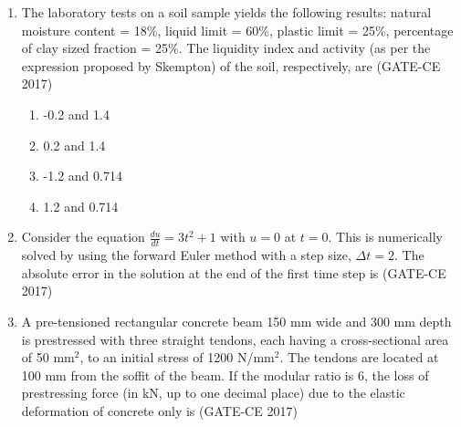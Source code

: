 \documentclass[journal,12pt,onecolumn]{article}
\theoremstyle{remark}
\begin{document}
\begin{enumerate}
    \item The laboratory tests on a soil sample yields the following results: natural moisture content = 18\%, liquid limit = 60\%, plastic limit = 25\%, percentage of clay sized fraction = 25\%. The liquidity index and activity (as per the expression proposed by Skempton) of the soil, respectively, are \hfill (GATE-CE 2017)
    \begin{multicols}{2}
    \begin{enumerate}
        \item -0.2 and 1.4
        \item 0.2 and 1.4
        \item -1.2 and 0.714
        \item 1.2 and 0.714
    \end{enumerate}
    \end{multicols}

    \item Consider the equation $\frac{du}{dt} = 3t^2 + 1$ with $u = 0$ at $t = 0$. This is numerically solved by using the forward Euler method with a step size, $\Delta t = 2$. The absolute error in the solution at the end of the first time step is \underline{\hspace{3cm}}\hfill (GATE-CE 2017)

    \item A pre-tensioned rectangular concrete beam 150 mm wide and 300 mm depth is prestressed with three straight tendons, each having a cross-sectional area of 50 mm$^2$, to an initial stress of 1200 N/mm$^2$. The tendons are located at 100 mm from the soffit of the beam. If the modular ratio is 6, the loss of prestressing force (in kN, up to one decimal place) due to the elastic deformation of concrete only is \underline{\hspace{3cm}}\hfill (GATE-CE 2017)


\end{enumerate}
\end{document}
